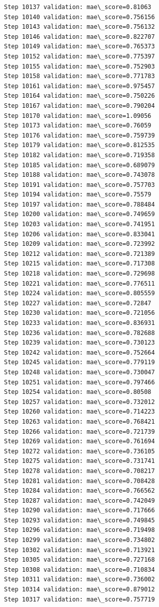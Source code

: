 \documentclass[11pt]{article}
\begin{document}
\begin{Verbatim}[commandchars=\\\{\}]
Step 10137 validation: mae\_score=0.81063
Step 10140 validation: mae\_score=0.756156
Step 10143 validation: mae\_score=0.756132
Step 10146 validation: mae\_score=0.822707
Step 10149 validation: mae\_score=0.765373
Step 10152 validation: mae\_score=0.775397
Step 10155 validation: mae\_score=0.752903
Step 10158 validation: mae\_score=0.771783
Step 10161 validation: mae\_score=0.975457
Step 10164 validation: mae\_score=0.750226
Step 10167 validation: mae\_score=0.790204
Step 10170 validation: mae\_score=1.09056
Step 10173 validation: mae\_score=0.76059
Step 10176 validation: mae\_score=0.759739
Step 10179 validation: mae\_score=0.812535
Step 10182 validation: mae\_score=0.719358
Step 10185 validation: mae\_score=0.689079
Step 10188 validation: mae\_score=0.743078
Step 10191 validation: mae\_score=0.757703
Step 10194 validation: mae\_score=0.75579
Step 10197 validation: mae\_score=0.788484
Step 10200 validation: mae\_score=0.749659
Step 10203 validation: mae\_score=0.741951
Step 10206 validation: mae\_score=0.833041
Step 10209 validation: mae\_score=0.723992
Step 10212 validation: mae\_score=0.721389
Step 10215 validation: mae\_score=0.717308
Step 10218 validation: mae\_score=0.729698
Step 10221 validation: mae\_score=0.776511
Step 10224 validation: mae\_score=0.805559
Step 10227 validation: mae\_score=0.72847
Step 10230 validation: mae\_score=0.721056
Step 10233 validation: mae\_score=0.836931
Step 10236 validation: mae\_score=0.782688
Step 10239 validation: mae\_score=0.730123
Step 10242 validation: mae\_score=0.752664
Step 10245 validation: mae\_score=0.779119
Step 10248 validation: mae\_score=0.730047
Step 10251 validation: mae\_score=0.797466
Step 10254 validation: mae\_score=0.80508
Step 10257 validation: mae\_score=0.732012
Step 10260 validation: mae\_score=0.714223
Step 10263 validation: mae\_score=0.768421
Step 10266 validation: mae\_score=0.721739
Step 10269 validation: mae\_score=0.761694
Step 10272 validation: mae\_score=0.736105
Step 10275 validation: mae\_score=0.731741
Step 10278 validation: mae\_score=0.708217
Step 10281 validation: mae\_score=0.708428
Step 10284 validation: mae\_score=0.766562
Step 10287 validation: mae\_score=0.742049
Step 10290 validation: mae\_score=0.717666
Step 10293 validation: mae\_score=0.749845
Step 10296 validation: mae\_score=0.719498
Step 10299 validation: mae\_score=0.734802
Step 10302 validation: mae\_score=0.713921
Step 10305 validation: mae\_score=0.727168
Step 10308 validation: mae\_score=0.710834
Step 10311 validation: mae\_score=0.736002
Step 10314 validation: mae\_score=0.879012
Step 10317 validation: mae\_score=0.757719

\end{Verbatim}
\end{document}
